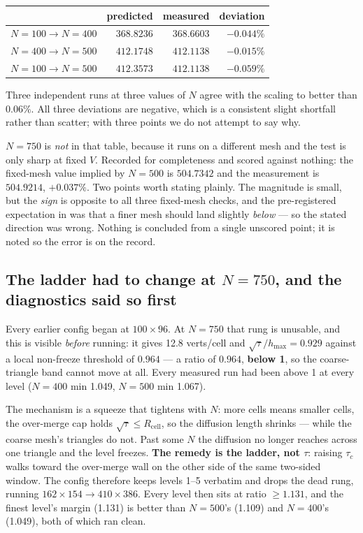\documentclass[11pt,a4paper]{article}
\begin{document}
\begin{center}\small
\begin{tabular}{@{}lrrr@{}}
\toprule
 & predicted & measured & deviation \\
\midrule
\(N{=}100 \to N{=}400\) & \(368.8236\) & \(368.6603\) & \(-0.044\%\) \\
\(N{=}400 \to N{=}500\) & \(412.1748\) & \(\mathbf{412.1138}\) & \(\mathbf{-0.015\%}\) \\
\(N{=}100 \to N{=}500\) & \(412.3573\) & \(412.1138\) & \(-0.059\%\) \\
\bottomrule
\end{tabular}
\end{center}

Three independent runs at three values of \(N\) agree with the scaling to better
than \(0.06\%\). All three deviations are negative, which is a consistent slight
shortfall rather than scatter; with three points we do not attempt to say why.

\(N{=}750\) is \emph{not} in that table, because it runs on a different mesh and
the test is only sharp at fixed \(V\). Recorded for completeness and scored
against nothing: the fixed-mesh value implied by \(N{=}500\) is \(504.7342\) and
the measurement is \(504.9214\), \(+0.037\%\). Two points worth stating plainly.
The magnitude is small, but the \emph{sign} is opposite to all three fixed-mesh
checks, and the pre-registered expectation in
 was that a finer mesh should land
slightly \emph{below} --- so the stated direction was wrong. Nothing is concluded
from a single unscored point; it is noted so the error is on the record.

\subsection*{The ladder had to change at \(N{=}750\), and the diagnostics said so first}
\label{sec:ladder750}

Every earlier config began at \(100\times96\). At \(N{=}750\) that rung is
unusable, and this is visible \emph{before} running: it gives 12.8 verts/cell and
\(\sqrt{\tau}/h_{\max} = 0.929\) against a local non-freeze threshold of
\(0.964\) --- a ratio of \(\mathbf{0.964}\), \textbf{below 1}, so the
coarse-triangle band cannot move at all. Every measured run had been above 1 at
every level (\(N{=}400\) min 1.049, \(N{=}500\) min 1.067).

The mechanism is a squeeze that tightens with \(N\): more cells means smaller
cells, the over-merge cap holds \(\sqrt{\tau} \le R_{\mathrm{cell}}\), so the
diffusion length shrinks --- while the coarse mesh's triangles do not. Past some
\(N\) the diffusion no longer reaches across one triangle and the level freezes.
\textbf{The remedy is the ladder, not \(\tau\)}: raising \(\tau_c\) walks toward
the over-merge wall on the other side of the same two-sided window. The config
therefore keeps levels 1--5 verbatim and drops the dead rung, running
\(162\times154 \to 410\times386\). Every level then sits at ratio \(\ge 1.131\),
and the finest level's margin (1.131) is better than \(N{=}500\)'s (1.109) and
\(N{=}400\)'s (1.049), both of which ran clean.
\end{document}
